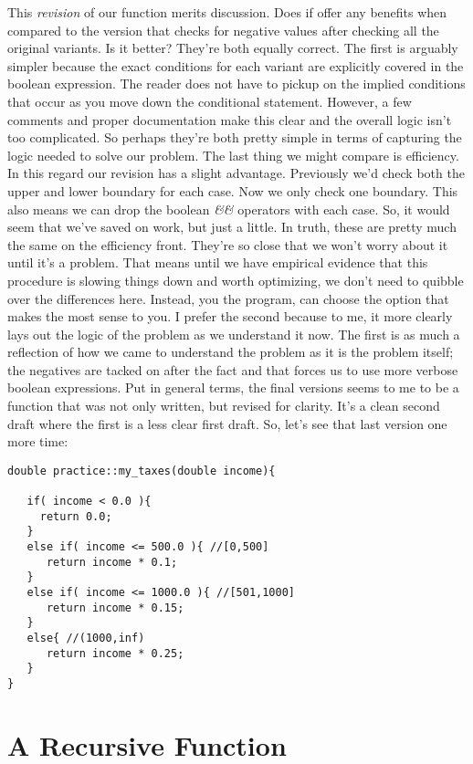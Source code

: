 \documentclass[]{tufte-handout}
\begin{document}
This \textit{revision} of our function merits discussion. Does if offer any benefits when compared to the version that checks for negative values after checking all the original variants. Is it better?  They're both equally correct. The first is arguably simpler because the exact conditions for each variant are explicitly covered in the boolean expression. The reader does not have to pickup on the implied conditions that occur as you move down the conditional statement. However, a few comments and proper documentation make this clear and the overall logic isn't too complicated. So perhaps they're both pretty simple in terms of capturing the logic needed to solve our problem. The last thing we might compare is efficiency. In this regard our revision has a slight advantage. Previously we'd check both the upper and lower boundary for each case. Now we only check one boundary. This also means we can drop the boolean \textit{\&\&} operators with each case. So, it would seem that we've saved on work, but just a little.  In truth, these are pretty much the same on the efficiency front. They're so close that we won't worry about it until it's a problem. That means until we have empirical evidence that this procedure is slowing things down and worth optimizing, we don't need to quibble over the differences here. Instead, you the program, can choose the option that makes the most sense to you. I prefer the second because to me, it more clearly lays out the logic of the problem as we understand it now. The first is as much a reflection of how we came to understand the problem as it is the problem itself; the negatives are tacked on after the fact and that forces us to use more verbose boolean expressions.  Put in general terms, the final versions seems to me to be a function that was not only written, but revised for clarity. It's a clean second draft where the first is a less clear first draft.  So, let's see that last version one more time:

\begin{verbatim}
double practice::my_taxes(double income){

   if( income < 0.0 ){
     return 0.0;
   } 
   else if( income <= 500.0 ){ //[0,500]
      return income * 0.1;
   }
   else if( income <= 1000.0 ){ //[501,1000]
      return income * 0.15;   
   }
   else{ //(1000,inf) 
      return income * 0.25;   
   }
}
\end{verbatim}

\section{A Recursive Function}
\end{document}

